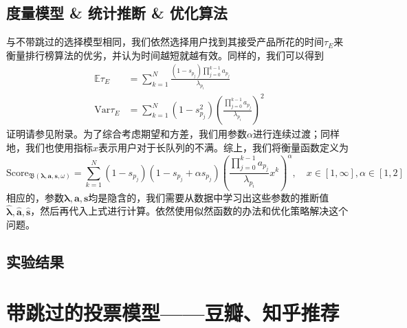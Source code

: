 \documentclass[UTF8]{ctexart}
\theoremstyle{plain}
\theoremstyle{definition}
\theoremstyle{remark}
\begin{document}
	\subsection{度量模型 \& 统计推断 \& 优化算法}
	与不带跳过的选择模型相同，我们依然选择用户找到其接受产品所花的时间$\tau_E$来衡量排行榜算法的优劣，并认为时间越短就越有效。同样的，我们可以得到
	\begin{equation}
	\begin{aligned}
	\mathbb{E} \tau_E & = \sum_{k=1}^N \frac{(1-s_{p_j})\prod\limits_{j=0}^{k-1}a_{p_j}}{\lambda_{p_i}} \\
	\mathrm{Var} \tau_E & = \sum_{k=1}^N (1-s_{p_j}^2)\left(\frac{\prod\limits_{j=0}^{k-1}a_{p_j}}{\lambda_{p_i}}\right)^2
	\end{aligned}
	\end{equation}
	证明请参见附录。为了综合考虑期望和方差，我们用参数$\alpha$进行连续过渡；同样地，我们也使用指标$x$表示用户对于长队列的不满。综上，我们将衡量函数定义为
	\begin{equation}
	\mathrm{Score}_{\mathfrak{B}\left(\bm{\lambda}, \bm{a}, \bm{s}, \omega\right)} = \sum_{k=1}^N (1-s_{p_j})(1-s_{p_j}+\alpha s_{p_j})\left(\frac{\prod\limits_{j=0}^{k-1}a_{p_j}}{\lambda_{p_i}} x^k\right)^\alpha, \quad x \in [1, \infty], \alpha \in [1, 2]
	\end{equation}
	相应的，参数$\bm{\lambda}, \bm{a}, \bm{s}$均是隐含的，我们需要从数据中学习出这些参数的推断值$\bm{\hat{\lambda}}, \bm{\hat{a}}, \bm{\hat{s}}$，然后再代入上式进行计算。依然使用似然函数的办法和优化策略解决这个问题。
	\subsection{实验结果}
	\section{带跳过的投票模型——豆瓣、知乎推荐}
\end{document}
